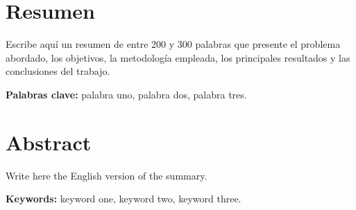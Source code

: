 \chapter*{Resumen}

Escribe aquí un resumen de entre 200 y 300 palabras que presente el problema abordado,
los objetivos, la metodología empleada, los principales resultados y las conclusiones
del trabajo.

\textbf{Palabras clave:} palabra uno, palabra dos, palabra tres.

\chapter*{Abstract}

Write here the English version of the summary.

\textbf{Keywords:} keyword one, keyword two, keyword three.
